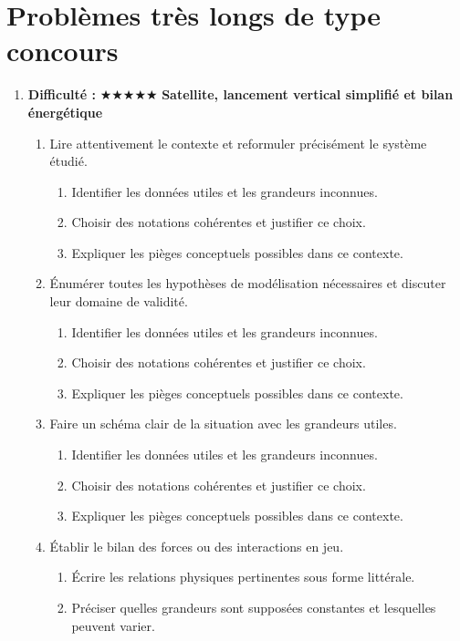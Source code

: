 \documentclass[11pt,a4paper]{article}
\newcommand{\etoiles}[1]{\textbf{Difficulté : }#1}
\begin{document}
\section{Problèmes très longs de type concours}
\begin{enumerate}[label=\textbf{Très long \arabic*.},leftmargin=*]
\item \etoiles{★★★★★}
\textbf{Satellite, lancement vertical simplifié et bilan énergétique}
\begin{enumerate}[label=\textbf{\arabic*)}]
\item Lire attentivement le contexte et reformuler précisément le système étudié.
\begin{enumerate}[label=\alph*)]
\item Identifier les données utiles et les grandeurs inconnues.
\item Choisir des notations cohérentes et justifier ce choix.
\item Expliquer les pièges conceptuels possibles dans ce contexte.
\end{enumerate}
\item Énumérer toutes les hypothèses de modélisation nécessaires et discuter leur domaine de validité.
\begin{enumerate}[label=\alph*)]
\item Identifier les données utiles et les grandeurs inconnues.
\item Choisir des notations cohérentes et justifier ce choix.
\item Expliquer les pièges conceptuels possibles dans ce contexte.
\end{enumerate}
\item Faire un schéma clair de la situation avec les grandeurs utiles.
\begin{enumerate}[label=\alph*)]
\item Identifier les données utiles et les grandeurs inconnues.
\item Choisir des notations cohérentes et justifier ce choix.
\item Expliquer les pièges conceptuels possibles dans ce contexte.
\end{enumerate}
\item Établir le bilan des forces ou des interactions en jeu.
\begin{enumerate}[label=\alph*)]
\item Écrire les relations physiques pertinentes sous forme littérale.
\item Préciser quelles grandeurs sont supposées constantes et lesquelles peuvent varier.

\end{enumerate}
\end{enumerate}
\end{enumerate}
\end{document}
